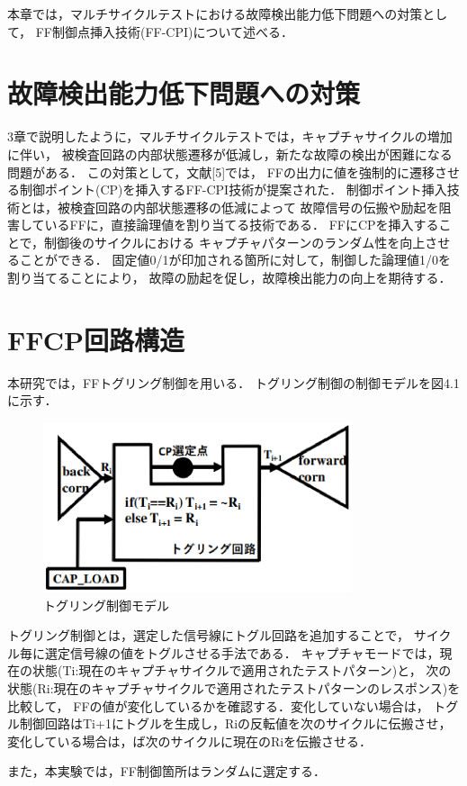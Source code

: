 本章では，マルチサイクルテストにおける故障検出能力低下問題への対策として，
FF制御点挿入技術(FF-CPI)について述べる．

\section{故障検出能力低下問題への対策}
3章で説明したように，マルチサイクルテストでは，キャプチャサイクルの増加に伴い，
被検査回路の内部状態遷移が低減し，新たな故障の検出が困難になる問題がある．
この対策として，文献[5]では，
FFの出力に値を強制的に遷移させる制御ポイント(CP)を挿入するFF-CPI技術が提案された．
制御ポイント挿入技術とは，被検査回路の内部状態遷移の低減によって
故障信号の伝搬や励起を阻害しているFFに，直接論理値を割り当てる技術である．
FFにCPを挿入することで，制御後のサイクルにおける
キャプチャパターンのランダム性を向上させることができる．
固定値0/1が印加される箇所に対して，制御した論理値1/0を割り当てることにより，
故障の励起を促し，故障検出能力の向上を期待する．

\section{FFCP回路構造}
本研究では，FFトグリング制御を用いる．
トグリング制御の制御モデルを図4.1に示す．

\begin{figure}[h]
    \begin{center}
        \includegraphics[height=50mm]{tgl.eps}
        \caption{トグリング制御モデル}
    \end{center}
\end{figure}

トグリング制御とは，選定した信号線にトグル回路を追加することで，
サイクル毎に選定信号線の値をトグルさせる手法である．
キャプチャモードでは，現在の状態(Ti:現在のキャプチャサイクルで適用されたテストパターン)と，
次の状態(Ri:現在のキャプチャサイクルで適用されたテストパターンのレスポンス)を比較して，
FFの値が変化しているかを確認する．変化していない場合は，
トグル制御回路はTi+1にトグルを生成し，Riの反転値を次のサイクルに伝搬させ，
変化している場合は，ば次のサイクルに現在のRiを伝搬させる．

また，本実験では，FF制御箇所はランダムに選定する．
